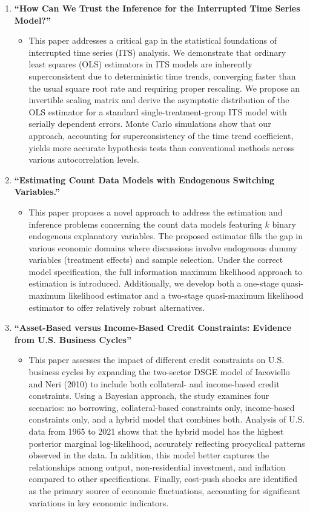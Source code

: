 \documentclass{article}
\begin{document}
\begin{enumerate}[resume]
\section*{Working in Progress}
    \item \textbf{“How Can We Trust the Inference for the Interrupted Time Series Model?”}
    \begin{itemize}
        \item[] This paper addresses a critical gap in the statistical foundations of interrupted time series (ITS) analysis. We demonstrate that ordinary least squares (OLS) estimators in ITS models are inherently superconsistent due to deterministic time trends, converging faster than the usual square root rate and requiring proper rescaling. We propose an invertible scaling matrix and derive the asymptotic distribution of the OLS estimator for a standard single-treatment-group ITS model with serially dependent errors. Monte Carlo simulations show that our approach, accounting for superconsistency of the time trend coefficient, yields more accurate hypothesis tests than conventional methods across various autocorrelation levels.
    \end{itemize}
    \item \textbf{“Estimating Count Data Models with Endogenous Switching Variables.”}
    \begin{itemize}
        \item[] This paper proposes a novel approach to address the estimation and inference problems concerning the count data models featuring $k$ binary endogenous explanatory variables. The proposed estimator fills the gap in various economic domains where discussions involve endogenous dummy variables (treatment effects) and sample selection. Under the correct model specification, the full information maximum likelihood approach to estimation is introduced. Additionally, we develop both a one-stage quasi-maximum likelihood estimator and a two-stage quasi-maximum likelihood estimator to offer relatively robust alternatives. 
    \end{itemize}
    \item \textbf{“Asset-Based versus Income-Based Credit Constraints: Evidence from U.S. Business Cycles”}
    \begin{itemize}
        \item[] This paper assesses the impact of different credit constraints on U.S. business cycles by expanding the two-sector DSGE model of Iacoviello and Neri (2010) to include both collateral- and income-based credit constraints. Using a Bayesian approach, the study examines four scenarios: no borrowing, collateral-based constraints only, income-based constraints only, and a hybrid model that combines both. Analysis of U.S. data from 1965 to 2021 shows that the hybrid model has the highest posterior marginal log-likelihood, accurately reflecting procyclical patterns observed in the data. In addition, this model better captures the relationships among output, non-residential investment, and inflation compared to other specifications. Finally, cost-push shocks are identified as the primary source of economic fluctuations, accounting for significant variations in key economic indicators.

\end{itemize}
\end{enumerate}
\end{document}
